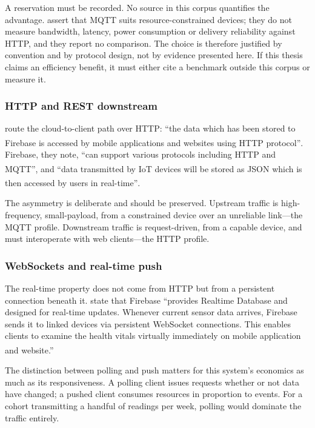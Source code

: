 \documentclass[12pt,a4paper,oneside]{report}
\newcommand{\bq}[1]{``#1''\textsuperscript{\dag}}
\begin{document}
A reservation must be recorded. No source in this corpus quantifies the advantage. \Textcite{efendi2025} assert that MQTT suits resource-constrained devices; they do not measure bandwidth, latency, power consumption or delivery reliability against HTTP, and they report no comparison. The choice is therefore justified by convention and by protocol design, not by evidence presented here. If this thesis claims an efficiency benefit, it must either cite a benchmark outside this corpus or measure it.

\subsubsection{HTTP and REST downstream}

\Textcite{efendi2025} route the cloud-to-client path over HTTP: \bq{the data which has been stored to Firebase is accessed by mobile applications and websites using HTTP protocol}. Firebase, they note, \bq{can support various protocols including HTTP and MQTT}, and \bq{data transmitted by IoT devices will be stored as JSON which is then accessed by users in real-time}.

The asymmetry is deliberate and should be preserved. Upstream traffic is high-frequency, small-payload, from a constrained device over an unreliable link---the MQTT profile. Downstream traffic is request-driven, from a capable device, and must interoperate with web clients---the HTTP profile.

\subsubsection{WebSockets and real-time push}

The real-time property does not come from HTTP but from a persistent connection beneath it. \Textcite{efendi2025} state that Firebase \bq{provides Realtime Database and designed for real-time updates. Whenever current sensor data arrives, Firebase sends it to linked devices via persistent WebSocket connections. This enables clients to examine the health vitals virtually immediately on mobile application and website.}

The distinction between polling and push matters for this system's economics as much as its responsiveness. A polling client issues requests whether or not data have changed; a pushed client consumes resources in proportion to events. For a cohort transmitting a handful of readings per week, polling would dominate the traffic entirely.
\end{document}
